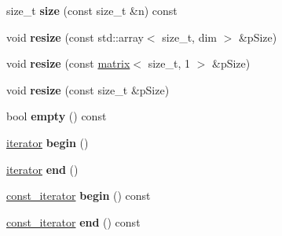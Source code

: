 \begin{DoxyCompactItemize}
\item 
\hypertarget{classkeycpp_1_1matrix_aae976395cf7fa4eea95deb475e3fe085}{size\-\_\-t {\bfseries size} (const size\-\_\-t \&n) const }\label{classkeycpp_1_1matrix_aae976395cf7fa4eea95deb475e3fe085}

\item 
\hypertarget{classkeycpp_1_1matrix_ad0abc30bb7fc8a2bd0e8998b954a4e65}{void {\bfseries resize} (const std\-::array$<$ size\-\_\-t, dim $>$ \&p\-Size)}\label{classkeycpp_1_1matrix_ad0abc30bb7fc8a2bd0e8998b954a4e65}

\item 
\hypertarget{classkeycpp_1_1matrix_a709d798964d53f5ab5436bace3f8789c}{void {\bfseries resize} (const \hyperlink{classkeycpp_1_1matrix}{matrix}$<$ size\-\_\-t, 1 $>$ \&p\-Size)}\label{classkeycpp_1_1matrix_a709d798964d53f5ab5436bace3f8789c}

\item 
\hypertarget{classkeycpp_1_1matrix_acde130c9f5c7b0c77372e8041189bf85}{void {\bfseries resize} (const size\-\_\-t \&p\-Size)}\label{classkeycpp_1_1matrix_acde130c9f5c7b0c77372e8041189bf85}

\item 
\hypertarget{classkeycpp_1_1matrix_a01ba974989150e9bb0687af01a152b50}{bool {\bfseries empty} () const }\label{classkeycpp_1_1matrix_a01ba974989150e9bb0687af01a152b50}

\item 
\hypertarget{classkeycpp_1_1matrix_a24292e6d6ff6c30446fdb6976e63135e}{\hyperlink{classkeycpp_1_1_pointer_iterator}{iterator} {\bfseries begin} ()}\label{classkeycpp_1_1matrix_a24292e6d6ff6c30446fdb6976e63135e}

\item 
\hypertarget{classkeycpp_1_1matrix_a4c48ca34a6f0292f9a39264e2d6148a4}{\hyperlink{classkeycpp_1_1_pointer_iterator}{iterator} {\bfseries end} ()}\label{classkeycpp_1_1matrix_a4c48ca34a6f0292f9a39264e2d6148a4}

\item 
\hypertarget{classkeycpp_1_1matrix_a4f372a4850a0151cf7ce69800cafc196}{\hyperlink{classkeycpp_1_1_pointer_iterator}{const\-\_\-iterator} {\bfseries begin} () const }\label{classkeycpp_1_1matrix_a4f372a4850a0151cf7ce69800cafc196}

\item 
\hypertarget{classkeycpp_1_1matrix_a4b05ed2716ac414b02e82f489d3db11a}{\hyperlink{classkeycpp_1_1_pointer_iterator}{const\-\_\-iterator} {\bfseries end} () const }\label{classkeycpp_1_1matrix_a4b05ed2716ac414b02e82f489d3db11a}


\end{DoxyCompactItemize}
